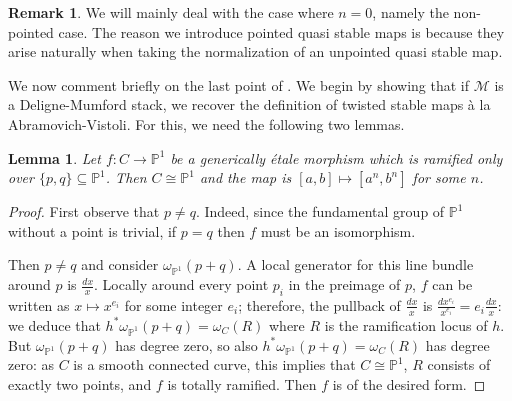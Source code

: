 \documentclass{amsart}
\newcommand{\bP}{\mathbb{P}}
\newcommand{\cM}{\mathcal{M}}
\newtheorem{Lemma}[theorem]{Lemma}
\theoremstyle{definition}
\newtheorem{Oss}[theorem]{Remark}
\begin{document}
\begin{Oss}We will mainly deal with the case where $n=0$, namely the non-pointed case. The reason we introduce pointed quasi stable maps is because they arise naturally when taking the normalization of an unpointed quasi stable map.
\end{Oss}

We now comment briefly on the last point of .
We begin by showing that if $\cM$ is a Deligne-Mumford stack, we recover the definition of twisted stable maps \`{a} la Abramovich-Vistoli. For this, we need the following two lemmas.
\begin{Lemma}\label{lemma C to p1 ramified at 2 points implies C=p1}
Let $f:C\to \bP^1$ be a generically \'etale morphism which is ramified only over $\{p,q\}\subseteq \bP^1$. Then $C\cong \bP^1$ and the map is $[a,b]\mapsto [a^n,b^n]$ for some $n$.
\end{Lemma}
\begin{proof}
First observe that $p\neq q$. Indeed, since the fundamental group of $\bP^1$ without a point is trivial, if $p=q$ then $f$ must be an isomorphism. 

Then $p\neq q$ and consider $\omega_{\bP^1}(p+q)$. A local generator for this line bundle around $p$ is $\frac{dx}{x}$.
Locally around every point $p_i$ in the preimage of $p$, $f$ can be written as $x\mapsto x^{e_i}$ for some integer $e_i$; therefore, the pullback of $\frac{dx}{x}$ is $\frac{dx^{e_i}}{x^{e_i}}=e_i\frac{dx}{x}$: we deduce that $h^*\omega_{\bP^1}(p+q)=\omega_C(R)$ where $R$ is the ramification locus of $h$.
But $\omega_{\bP^1}(p+q)$ has degree zero, so also $h^*\omega_{\bP^1}(p+q)=\omega_C(R)$ has degree zero: as $C$ is a smooth connected curve, this implies that $C\cong \bP^1$, $R$ consists of exactly two points, and $f$ is totally ramified. Then $f$ is of the desired form.
\end{proof}
\end{document}
